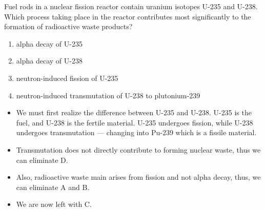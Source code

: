 \documentclass[a4paper,12pt]{article}
\begin{document}
Fuel rods in a nuclear fission reactor contain uranium isotopes U-235 and U-238. Which process taking place in the reactor contributes most significantly to the formation of radioactive waste products?
\begin{enumerate}[label=(\Alph*)]
  \item alpha decay of U-235
  \item alpha decay of U-238
  \item neutron-induced fission of U-235
  \item neutron-induced transmutation of U-238 to plutonium-239
\end{enumerate}
\begin{itemize}
  \item We must first realize the difference between U-235 and U-238. U-235 is the fuel, and U-238 is the fertile material. U-235 undergoes fission, while U-238 undergoes transmutation --- changing into Pu-239 which is a fissile material.
  \item Transmutation does not directly contribute to forming nuclear waste, thus we can eliminate D.
  \item Also, radioactive waste main arises from fission and not alpha decay, thus, we can eliminate A and B.
  \item We are now left with C.
\end{itemize}
\end{document}
